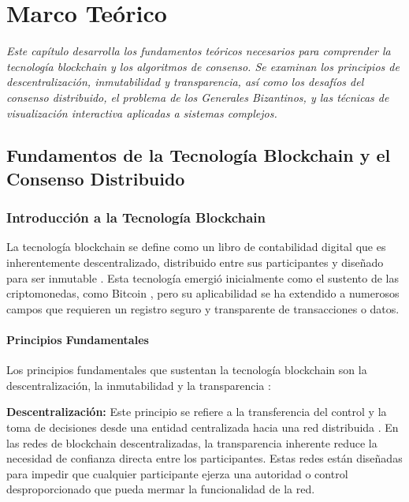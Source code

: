 \documentclass[spanish,12pt,letterpaper]{report}
\begin{document}
\chapter{Marco Teórico}

\textit{Este capítulo desarrolla los fundamentos teóricos necesarios para comprender la tecnología blockchain y los algoritmos de consenso. Se examinan los principios de descentralización, inmutabilidad y transparencia, así como los desafíos del consenso distribuido, el problema de los Generales Bizantinos, y las técnicas de visualización interactiva aplicadas a sistemas complejos.}

\newpage

\section{Fundamentos de la Tecnología Blockchain y el Consenso Distribuido}

\subsection{Introducción a la Tecnología Blockchain}

La tecnología blockchain se define como un libro de contabilidad digital que es inherentemente descentralizado, distribuido entre sus participantes y diseñado para ser inmutable \parencite{aws2025blockchain}. Esta tecnología emergió inicialmente como el sustento de las criptomonedas, como Bitcoin \parencite{nakamoto2008bitcoin}, pero su aplicabilidad se ha extendido a numerosos campos que requieren un registro seguro y transparente de transacciones o datos.

\subsubsection{Principios Fundamentales}

Los principios fundamentales que sustentan la tecnología blockchain son la descentralización, la inmutabilidad y la transparencia \parencite{amores2020blockchain}:

\textbf{Descentralización:} Este principio se refiere a la transferencia del control y la toma de decisiones desde una entidad centralizada hacia una red distribuida \parencite{aws2025blockchain}. En las redes de blockchain descentralizadas, la transparencia inherente reduce la necesidad de confianza directa entre los participantes. Estas redes están diseñadas para impedir que cualquier participante ejerza una autoridad o control desproporcionado que pueda mermar la funcionalidad de la red.
\end{document}
